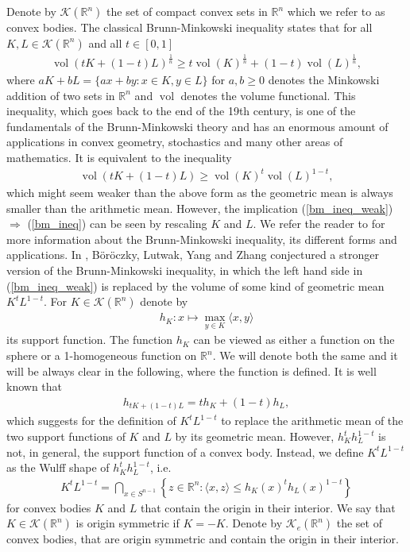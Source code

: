 \documentclass[12pt,twoside]{amsart}
\numberwithin{satz}{section}
\theoremstyle{definition}
\numberwithin{equation}{section}
\newcommand\R{\mathbb{R}}
\newcommand\vol{\operatorname{vol}}
\newcommand\Kc{\mathcal{K}}
\begin{document}
	Denote by $\Kc(\R^n)$ the set of compact convex sets in $\R^n$ which we refer to as convex bodies. The classical Brunn-Minkowski inequality states that for all $K,L\in\Kc(\R^n)$ and all $t\in[0,1]$
	\begin{align}\label{bm_ineq}
		\vol(tK+(1-t)L)^{\frac{1}{n}}\geq t\vol(K)^{\frac{1}{n}}+(1-t)\vol(L)^{\frac{1}{n}},
	\end{align}
	where $aK+bL=\{ax+by:x\in K,y\in L\}$ for $a,b \geq 0$ denotes the Minkowski addition of two sets in $\R^n$ and $\vol$ denotes the volume functional. This inequality, which goes back to the end of the 19th century, is one of the fundamentals of the Brunn-Minkowski theory and has an enormous amount of applications in convex geometry, stochastics and many other areas of mathematics. It is equivalent to the inequality
	\begin{align}\label{bm_ineq_weak}
		\vol(tK+(1-t)L)\geq \vol(K)^t\vol(L)^{1-t},
	\end{align}
	which might seem weaker than the above form as the geometric mean is always smaller than the arithmetic mean. However, the implication (\ref{bm_ineq_weak}) $\Rightarrow$ (\ref{bm_ineq}) can be seen by rescaling $K$ and $L$. We refer the reader to \cite{gardener} for more information about the Brunn-Minkowski inequality, its different forms and applications. In \cite{boeroeczkylutwagyangzhang}, Böröczky, Lutwak, Yang and Zhang conjectured a stronger version of the Brunn-Minkowski inequality, in which the left hand side in (\ref{bm_ineq_weak}) is replaced by the volume of some kind of geometric mean $K^tL^{1-t}$. For $K\in\Kc(\R^n)$ denote by
	\begin{align*}
		h_K:x\mapsto \max_{y\in K}\langle x,y\rangle
	\end{align*}
	its support function. The function $h_K$ can be viewed as either a function on the sphere or a 1-homogeneous function on $\R^n$. We will denote both the same and it will be always clear in the following, where the function is defined. It is well known that
	\begin{align*}
		h_{tK+(1-t)L}=th_K+(1-t)h_L,
	\end{align*}
	which suggests for the definition of $K^tL^{1-t}$ to replace the arithmetic mean of the two support functions of $K$ and $L$ by its geometric mean. However, $h_K^th_L^{1-t}$ is not, in general, the support function of a convex body. Instead, we define $K^tL^{1-t}$ as the Wulff shape of $h_K^th_L^{1-t}$, i.e.
	\begin{align*}
		K^tL^{1-t}=\bigcap_{x\in S^{n-1}}\left\{z\in\R^n:\langle x,z\rangle\leq h_K(x)^th_L(x)^{1-t} \right\}
	\end{align*}
	for convex bodies $K$ and $L$ that contain the origin in their interior. We say that $K\in\Kc(\R^n)$ is origin symmetric if $K=-K$. Denote by $\Kc_e(\R^n)$ the set of convex bodies, that are origin symmetric and contain the origin in their interior.
	
\end{document}
